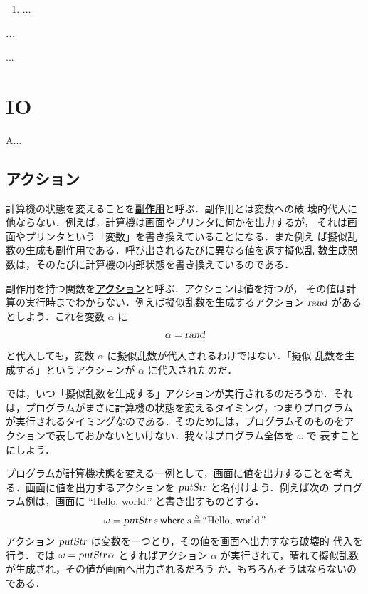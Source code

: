 \documentclass[a5paper,twoside,fleqn,draft]{jsbook}
\newenvironment{note}[1]{\begin{boxnote}\begin{center}\textbf{#1}\end{center}}{\end{boxnote}}
\newcommand{\keyword}[1]{{\underline{\textbf{#1}}}}
\newcommand{\mKeyword}[1]{\mathsf{#1}} %
\newcommand{\mWhereKeyword}{\mKeyword{where}}
\newcommand{\mString}[1]{\text{#1}}
\newcommand{\mAction}[1]{\textsl{#1}}
\DeclareMathOperator{\mPutStr}{\mAction{putStr}}
\DeclareMathOperator{\mRand}{\mAction{rand}}
\DeclareMathOperator{\mLetEq}{\triangleq}
\newcommand{\mWhereIs}[2]{\mathbin{\mWhereKeyword}#1\mLetEq#2}
\begin{document}
\begin{enumerate}
\item ...
\end{enumerate}


\begin{note}{...}
...
\end{note}


\chapter{IO}
\label{ch:io}

A...

\section{アクション}

計算機の状態を変えることを\keyword{副作用}と呼ぶ．副作用とは変数への破
壊的代入に他ならない．例えば，計算機は画面やプリンタに何かを出力するが，
それは画面やプリンタという「変数」を書き換えていることになる．また例え
ば擬似乱数の生成も副作用である．呼び出されるたびに異なる値を返す擬似乱
数生成関数は，そのたびに計算機の内部状態を書き換えているのである．

副作用を持つ関数を\keyword{アクション}と呼ぶ．アクションは値を持つが，
その値は計算の実行時までわからない．例えば擬似乱数を生成するアクション
$\mRand$ があるとしよう．これを変数 $\alpha$ に
\begin{equation}
\alpha=\mRand
\end{equation}
と代入しても，変数 $\alpha$ に擬似乱数が代入されるわけではない．「擬似
  乱数を生成する」というアクションが $\alpha$ に代入されたのだ．

では，いつ「擬似乱数を生成する」アクションが実行されるのだろうか．それ
は，プログラムがまさに計算機の状態を変えるタイミング，つまりプログラム
が実行されるタイミングなのである．そのためには，プログラムそのものをア
クションで表しておかないといけない．我々はプログラム全体を $\omega$ で
表すことにしよう．

プログラムが計算機状態を変える一例として，画面に値を出力することを考え
る．画面に値を出力するアクションを $\mPutStr$ と名付けよう．例えば次の
プログラム例は，画面に ``Hello, world.'' と書き出すものとする．
\begin{equation}
\omega=\mPutStr s\mWhereIs{s}{\mString{``Hello, world.''}}
\end{equation}
アクション $\mPutStr$ は変数を一つとり，その値を画面へ出力すなち破壊的
代入を行う．では $\omega=\mPutStr\alpha$ とすればアクション $\alpha$
が実行されて，晴れて擬似乱数が生成され，その値が画面へ出力されるだろう
か．もちろんそうはならないのである．
\end{document}
